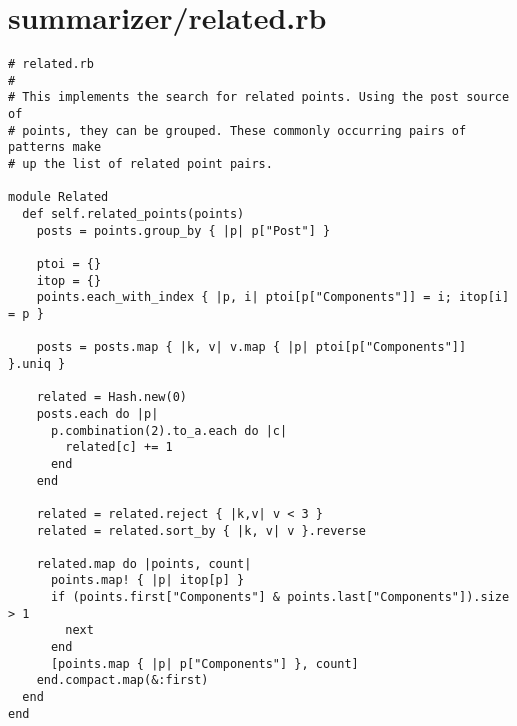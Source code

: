 \documentclass{article}
\begin{document}
\section*{summarizer/related.rb}
\begin{verbatim}
# related.rb
#
# This implements the search for related points. Using the post source of
# points, they can be grouped. These commonly occurring pairs of patterns make
# up the list of related point pairs.

module Related
  def self.related_points(points)
    posts = points.group_by { |p| p["Post"] }

    ptoi = {}
    itop = {}
    points.each_with_index { |p, i| ptoi[p["Components"]] = i; itop[i] = p }

    posts = posts.map { |k, v| v.map { |p| ptoi[p["Components"]] }.uniq }

    related = Hash.new(0)
    posts.each do |p|
      p.combination(2).to_a.each do |c|
        related[c] += 1
      end
    end

    related = related.reject { |k,v| v < 3 }
    related = related.sort_by { |k, v| v }.reverse

    related.map do |points, count|
      points.map! { |p| itop[p] }
      if (points.first["Components"] & points.last["Components"]).size > 1
        next
      end
      [points.map { |p| p["Components"] }, count]
    end.compact.map(&:first)
  end
end


\end{verbatim}
\pagebreak
\end{document}
